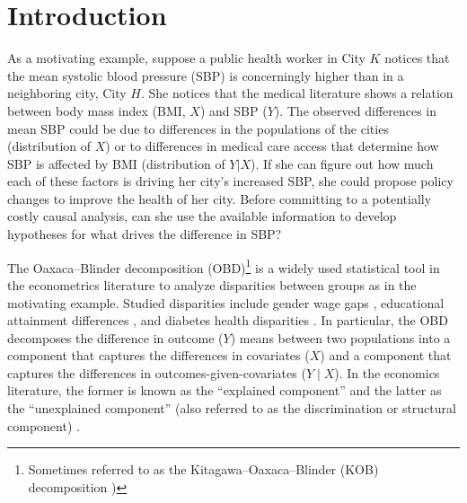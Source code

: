 \section{Introduction}
As a motivating example, suppose a public health worker in City $K$ notices that the mean systolic blood pressure (SBP) is concerningly higher than in a neighboring city, City $H$.
She notices that the medical literature shows a relation between body mass index (BMI, $X$) and SBP ($Y$).
The observed differences in mean SBP could be due to differences in the populations of the cities (distribution of $X$) or to differences in medical care access that determine how SBP is affected by BMI (distribution of $Y|X$).
If she can figure out how much each of these factors is driving her city's increased SBP, she could propose policy changes to improve the health of her city.
Before committing to a potentially costly causal analysis, can she use the available information to develop hypotheses for what drives the difference in SBP?


The Oaxaca--Blinder decomposition (OBD)\footnote{Sometimes referred to as the Kitagawa--Oaxaca--Blinder (KOB) decomposition \citealp{kitagawa1955})} \citep{oaxaca1973,blinder1973} is a widely used statistical tool in the econometrics literature to analyze disparities between groups as in the motivating example. 
Studied disparities include gender wage gaps \citep{paradaContzen2025}, educational attainment differences \citep{barhaim2023}, and diabetes health disparities \citep{cartwright2021}.
In particular, the OBD decomposes the difference in outcome (\(Y\)) means between two populations into a component that captures the differences in covariates (\(X\)) and a component that captures the differences in outcomes-given-covariates (\(Y \mid X\)). 
In the economics literature, the former is known as the ``explained component'' and the latter as the ``unexplained component'' (also referred to as the discrimination or structural component) \citep[p.~5]{fortinLemieuxFirpo2011}.

